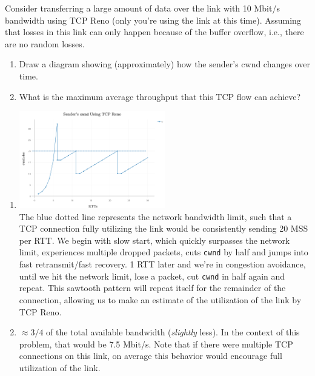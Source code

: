 \documentclass{report}
\begin{document}
\clearpage
\begin{problem}

Consider transferring a large amount of data over the link with 10 Mbit/s
bandwidth using TCP Reno (only you're using the link at this time). Assuming
that losses in this link can only happen because of the buffer overflow, i.e.,
there are no random losses.
\begin{enumerate}
	\item Draw a diagram showing (approximately) how the sender’s cwnd changes
        over time.
	\item What is the maximum average throughput that this TCP flow can achieve?
\end{enumerate}

\begin{answer}{40em}
  \begin{enumerate}
    \item \includegraphics[valign=t,width=0.5\textwidth]{TCP-RENO}\\
          The blue dotted line represents the network bandwidth limit, such that
          a TCP connection fully utilizing the link would be consistently
          sending 20 MSS per RTT. We begin with slow start, which quickly
          surpasses the network limit, experiences multiple dropped packets,
          cuts \texttt{cwnd} by half and jumps into fast retransmit/fast
          recovery. 1 RTT later and we're in congestion avoidance, until we hit
          the network limit, lose a packet, cut \texttt{cwnd} in half again and
          repeat. This sawtooth pattern will repeat itself for the remainder of
          the connection, allowing us to make an estimate of the utilization of the link by TCP Reno.
    \item $\approx 3/4$ of the total available bandwidth (\textit{slightly}
           less). In the context of this problem, that would be 7.5 Mbit/s.
           Note that if there were multiple TCP connections on this link, on
           average this behavior would encourage full utilization of the link.
  \end{enumerate}
\end{answer}

\end{problem}
\end{document}
